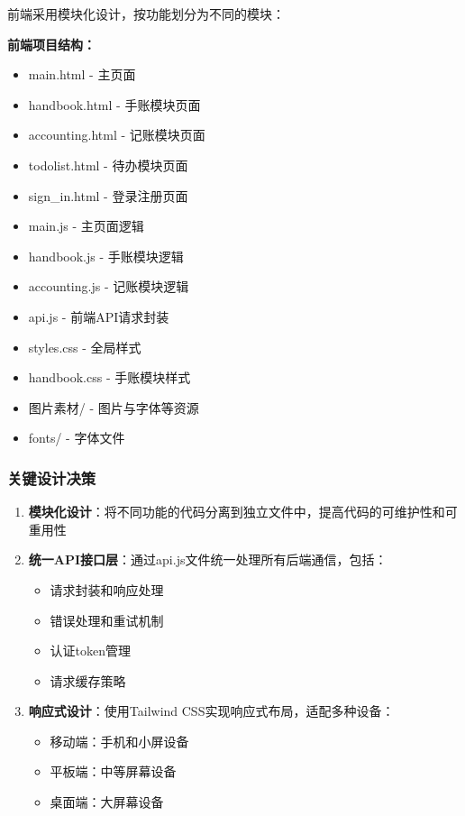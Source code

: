 \documentclass[a4paper]{article}
\begin{document}
前端采用模块化设计，按功能划分为不同的模块：

\textbf{前端项目结构：}
\begin{itemize}
    \item main.html - 主页面
    \item handbook.html - 手账模块页面
    \item accounting.html - 记账模块页面
    \item todolist.html - 待办模块页面
    \item sign\_in.html - 登录注册页面
    \item main.js - 主页面逻辑
    \item handbook.js - 手账模块逻辑
    \item accounting.js - 记账模块逻辑
    \item api.js - 前端API请求封装
    \item styles.css - 全局样式
    \item handbook.css - 手账模块样式
    \item 图片素材/ - 图片与字体等资源
    \item fonts/ - 字体文件
\end{itemize}

\subsubsection{关键设计决策}

\begin{enumerate}
    \item \textbf{模块化设计}：将不同功能的代码分离到独立文件中，提高代码的可维护性和可重用性
    
    \item \textbf{统一API接口层}：通过api.js文件统一处理所有后端通信，包括：
    \begin{itemize}
        \item 请求封装和响应处理
        \item 错误处理和重试机制
        \item 认证token管理
        \item 请求缓存策略
    \end{itemize}
    
    \item \textbf{响应式设计}：使用Tailwind CSS实现响应式布局，适配多种设备：
    \begin{itemize}
        \item 移动端：手机和小屏设备
        \item 平板端：中等屏幕设备
        \item 桌面端：大屏幕设备
    \end{itemize}
\end{enumerate}
\end{document}

